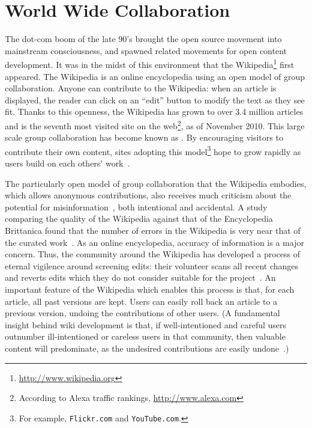 \section{World Wide Collaboration}

The dot-com boom of the late 90's brought the open source movement into
mainstream consciousness, and spawned related movements for open
content development.
It was in the midst of this environment that the
Wikipedia\footnote{\url{http://www.wikipedia.org}}
first appeared.
The Wikipedia
is an online encyclopedia using an open model of group collaboration.
Anyone can contribute to the Wikipedia: when an article is
displayed, the reader can click on an ``edit'' button to modify
the text as they see fit.
Thanks to this openness, the Wikipedia has grown to
over 3.4 million articles and is the seventh most visited site on the
web\footnote{According to Alexa traffic rankings, \url{http://www.alexa.com}},
as of November 2010.
This large scale group collaboration
has become known as .
By encouraging visitors to contribute their own content,
sites adopting this model\footnote{For example,
\texttt{Flickr.com} and \texttt{YouTube.com}.}
hope to grow rapidly as users build on each others' work~\cite{Taylor2007}.



The particularly open model of group collaboration that the Wikipedia embodies,
which allows anonymous contributions,
also receives much criticism about the potential for
misinformation~\cite{Seigenthaler05,Stross2006,NewYorkTimes05a,TheSun06,NewZelandHerald06,BBC06,NewYorkTimes06,TheNewYorker06,BBC07},
both intentional and accidental.
A study comparing the quality of the Wikipedia against that
of the Encyclopedia Brittanica found that the number of errors
in the Wikipedia is very near that of the curated work~\cite{Giles2005}.
As an online encyclopedia, accuracy of information is a major concern.
Thus, the community around the Wikipedia has developed a process
of eternal vigilence around screening edits: their volunteer  scans
all recent changes and reverts edits which they do not consider
suitable for the project~\cite{wiki:RCPatrol}.
An important feature of the Wikipedia which enables this
process is that, for each article,
all past versions are kept.
Users can easily roll back an article to a previous version,
undoing the contributions of other users.
(A fundamental insight behind wiki development is that,
if well-intentioned and careful users outnumber ill-intentioned
or careless users in that community, then valuable content will predominate,
as the undesired contributions are easily undone~\cite{Wikis01}.)

